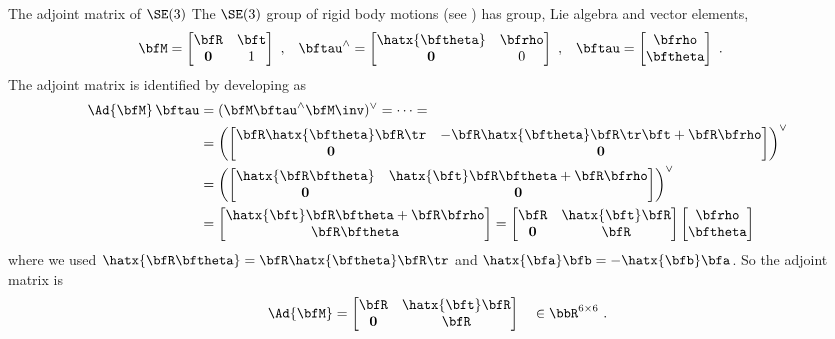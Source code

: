 
\begin{fexample}{The adjoint matrix of $\SE(3)$}\label{ex:SE3_adjoint}
%
The $\SE(3)$ group of rigid body motions (see ) has group, Lie algebra and vector elements,
%
\begin{align*}
\bfM&=\begin{bmatrix}\bfR&\bft\\\bf0&1\end{bmatrix}
~,
&
\bftau\hhat&=\begin{bmatrix}\hatx{\bth}&\bfrho\\\bf0&0\end{bmatrix}
~,
&
\bftau &=\begin{bmatrix}\bfrho\\\bth\end{bmatrix}
~.
\end{align*}
%
The adjoint matrix is identified by developing  as
%
\begin{align*}
\Ad{\bfM}\,\bftau
  &= (\bfM\bftau\hhat\bfM\inv)\vvee = \cdots =
  \\
  &= \left(\begin{bmatrix}\bfR\hatx{\bth}\bfR\tr & -\bfR\hatx{\bth}\bfR\tr\bft + \bfR\bfrho \\ \bf0 & \bf0\end{bmatrix}\right)\vvee \\
  &= \left(\begin{bmatrix}\hatx{\bfR\bth} & \hatx{\bft}\bfR\bth + \bfR\bfrho \\ \bf0 & \bf0\end{bmatrix}\right)\vvee \\
  &= \begin{bmatrix}\hatx{\bft}\bfR\bth + \bfR\bfrho \\ \bfR\bth\end{bmatrix} 
  = \begin{bmatrix}\bfR & \hatx{\bft}\bfR\\ \bf0&\bfR\end{bmatrix}\begin{bmatrix}\bfrho \\ \bth\end{bmatrix} 
\end{align*}
%
where we used $\hatx{\bfR\bth}=\bfR\hatx{\bth}\bfR\tr$ and $\hatx{\bfa}\bfb=-\hatx{\bfb}\bfa$. So the adjoint matrix is 
%
\begin{align*}
\Ad{\bfM} =  \begin{bmatrix}\bfR & \hatx{\bft}\bfR \\ \bf0&\bfR\end{bmatrix} \quad\in\bbR^{6\times6}
~.
\end{align*}
%
\end{fexample}		
